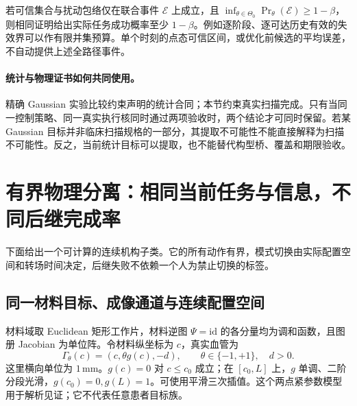 \documentclass[UTF8,fontset=fandol,zihao=5,a4paper]{ctexart}
\theoremstyle{definition}
\theoremstyle{remark}\newtheorem{remark}[theorem]{说明}
\numberwithin{equation}{section}
\begin{document}
若可信集合与扰动包络仅在联合事件 \(\mathcal E\) 上成立，且
\(\inf_{\theta\in\Theta_0}\Pr_\theta(\mathcal E)\ge1-\beta\)，则相同证明给出实际任务成功概率至少 \(1-\beta\)。例如逐阶段、逐可达历史有效的失效界可以作有限并集预算。单个时刻的点态可信区间，或优化前候选的平均误差，不自动提供上述全路径事件。

\paragraph{统计与物理证书如何共同使用。}
精确 Gaussian 实验比较约束声明的统计合同；本节约束真实扫描完成。只有当同一控制策略、同一真实执行核同时通过两项验收时，两个结论才可同时保留。若某 Gaussian 目标并非临床扫描规格的一部分，其提取不可能性不能直接解释为扫描不可能性。反之，当前统计目标可以提取，也不能替代构型桥、覆盖和期限验收。

\section{有界物理分离：相同当前任务与信息，不同后继完成率}
\label{sec:bounded-physical-example}

下面给出一个可计算的连续机构子类。它的所有动作有界，模式切换由实际配置空间和转场时间决定，后继失败不依赖一个人为禁止切换的标签。

\subsection{同一材料目标、成像通道与连续配置空间}

材料域取 Euclidean 矩形工作片，材料逆图 \(\Psi=\mathrm{id}\) 的各分量均为调和函数，且图册 Jacobian 为单位阵。令材料纵坐标为 \(c\)，真实血管为
\begin{equation}
\Gamma_\theta(c)=(c,\theta g(c),-d),\qquad
\theta\in\{-1,+1\},\quad d>0.
\label{eq:example-vessel}
\end{equation}
这里横向单位为 \(1\,\mathrm{mm}\)。\(g(c)=0\) 对 \(c\le c_0\) 成立；在 \([c_0,L]\) 上，\(g\) 单调、二阶分段光滑，\(g(c_0)=0,g(L)=1\)。可使用平滑三次插值。这个两点紧参数模型用于解析见证；它不代表任意患者目标族。
\end{document}

